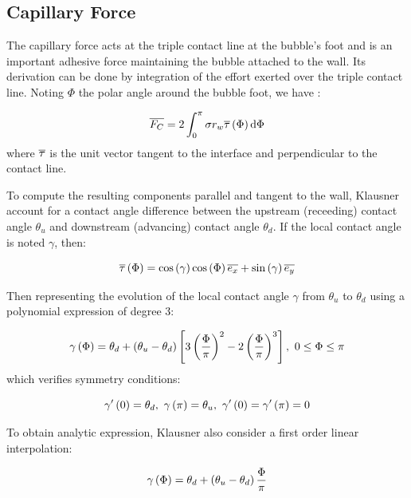 \subsection{Capillary Force}

The capillary force acts at the triple contact line at the bubble's foot and is an important adhesive force maintaining the bubble attached to the wall. Its derivation can be done by integration of the effort exerted over the triple contact line. Noting $\Phi$ the polar angle around the bubble foot, we have :


\begin{equation}
\overline{F_{C}} = 2 \int_{0}^{\pi} \sigma r_{w} \overline{\tau}\left( \Phi \right) \mathrm{d}\Phi
\end{equation}
where $\overline{\tau}$ is the unit vector tangent to the interface and perpendicular to the contact line.

To compute the resulting components parallel and tangent to the wall, Klausner \etal \cite{klausner_vapor_1993} account for a contact angle difference between the upstream (receeding) contact angle $\theta_{u}$ and downstream (advancing) contact angle $\theta_{d}$. If the local contact angle is noted $\gamma$, then:

\begin{equation}
\overline{\tau}\left( \Phi \right) = \mathrm{cos}\left( \gamma \right) \mathrm{cos}\left( \Phi \right) \overline{e_{x}} + \mathrm{sin}\left( \gamma \right) \overline{e_{y}}
\end{equation}

Then representing the evolution of the local contact angle $\gamma$ from $\theta_{u}$ to $\theta_{d}$ using a polynomial expression of degree 3:


\begin{equation}
\gamma\left( \Phi \right) = \theta_{d} + \left( \theta_{u} - \theta_{d} \right) \left[ 3\left( \frac{\Phi}{ \pi} \right)^{2} - 2\left( \frac{\Phi}{\pi} \right)^{3} \right],\ 0 \leq \Phi \leq \pi
\label{eq:forces_klausner_poly_deg3}
\end{equation}
which verifies symmetry conditions:

\begin{equation}
\gamma'\parth{0} = \theta_{d},\ \gamma\parth{\pi} = \theta_{u},\ \gamma'\parth{0}=\gamma'\parth{\pi}=0
\end{equation}

To obtain analytic expression, Klausner \etal also consider a first order linear interpolation:

\begin{equation}
\gamma\left( \Phi \right) = \theta_{d} + \left( \theta_{u}-\theta_{d} \right)\frac{\Phi}{\pi}
\end{equation}

